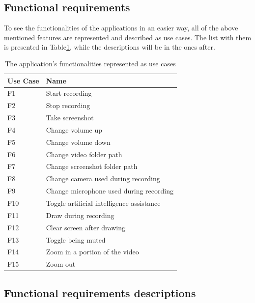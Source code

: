\subsection{Functional requirements}
\label{sec:specssec1subsec1}

\par To see the functionalities of the applications in an easier way, all of the above mentioned features are represented and described as use cases. The list with them is presented in Table\ref{UseCaseTable}, while the descriptions will be in the ones after.

\begin{table}[htbp]
\begin{center}
\begin{tabular}
{|p{90pt}|p{270pt}|}
\hline
 Use Case & Name\\
\hline 
\hline F1 & Start recording \\
\hline F2 & Stop recording \\
\hline F3 & Take screenshot \\
\hline F4 & Change volume up \\
\hline F5 & Change volume down \\
\hline F6 & Change video folder path \\
\hline F7 & Change screenshot folder path \\
\hline F8 & Change camera used during recording \\
\hline F9 & Change microphone used during recording \\
\hline F10 & Toggle artificial intelligence assistance \\
\hline F11 & Draw during recording \\
\hline F12 & Clear screen after drawing \\
\hline F13 & Toggle being muted \\
\hline F14 & Zoom in a portion of the video \\
\hline F15 & Zoom out \\
\hline
\end{tabular}
\end{center}
\caption{The application's functionalities represented as use cases}
\label{UseCaseTable}
\end{table}

\subsection{Functional requirements descriptions}
\label{sec:specssec1subsec1d1}

